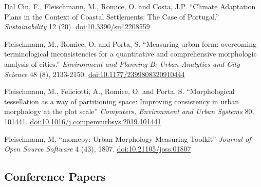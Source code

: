 \documentclass[12pt,a4paper]{report}
\begin{document}
\begin{tablist}
        \item[2020] \tab{}Dal Cin, F., Fleischmann, M., Romice, O. and Costa, J.P. \enquote{Climate Adaptation Plans in the Context of Coastal Settlements: The Case of Portugal.} \textit{Sustainability} 12 (20). \href{https://doi.org/10.3390/su12208559}{doi:10.3390/su12208559}

        \item[2020] \tab{}Fleischmann, M., Romice, O. and Porta, S. \enquote{Measuring urban form: overcoming terminological inconsistencies for a quantitative and comprehensive morphologic analysis of cities.} \textit{Environment and Planning B: Urban Analytics and City Science} 48 (8), 2133-2150. \href{https://doi.org/10.1177/2399808320910444}{doi:10.1177/2399808320910444}

        \item[2020] \tab{}Fleischmann, M., Feliciotti, A., Romice, O. and Porta, S. \enquote{Morphological tessellation as a way of partitioning space: Improving consistency in urban morphology at the plot scale} \textit{Computers, Environment and Urban Systems} 80, 101441. \href{https://doi.org/10.1016/j.compenvurbsys.2019.101441}{doi:10.1016/j.compenvurbsys.2019.101441}

        \item[2019] \tab{}Fleischmann, M. \enquote{momepy: Urban Morphology Measuring Toolkit} \textit{Journal of Open Source Software} 4 (43), 1807. \href{https://doi.org/10.21105/joss.01807}{doi:10.21105/joss.01807}


    \end{tablist}

    \subsection*{Conference Papers}
\end{document}
